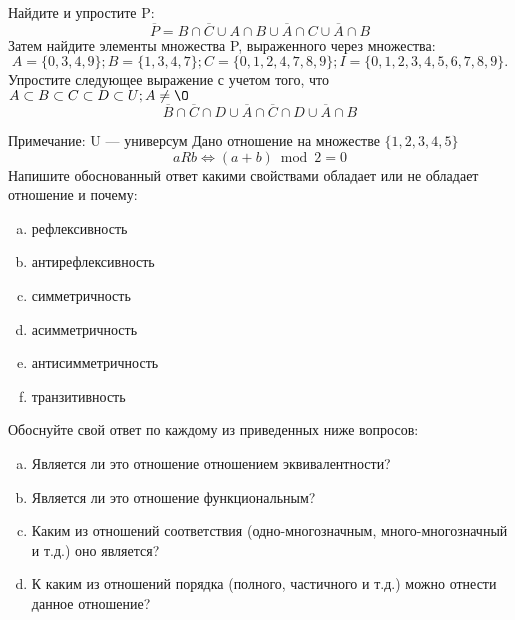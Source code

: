 \documentclass[10pt]{exam}
\begin{document}
\begin{questions}
\question
Найдите и упростите P:
\begin{equation*}
\overline{P} = B \cap \overline{C} \cup A \cap B \cup \overline{A} \cap C \cup \overline{A} \cap B
\end{equation*}
Затем найдите элементы множества P, выраженного через множества:
\begin{equation*}
A = \{0, 3, 4, 9\}; 
B = \{1, 3, 4, 7\};
C = \{0, 1, 2, 4, 7, 8, 9\};
I = \{0, 1, 2, 3, 4, 5, 6, 7, 8, 9\}.
\end{equation*}\question
Упростите следующее выражение с учетом того, что $A\subset B \subset C \subset D \subset U; A \neq \O$
\begin{equation*}
\overline{B} \cap \overline{C} \cap D \cup \overline{A} \cap \overline{C} \cap D \cup \overline{A} \cap B
\end{equation*}

Примечание: U — универсум\question
Дано отношение на множестве $\{1, 2, 3, 4, 5\}$ 
\begin{equation*}
aRb \iff (a+b) \bmod 2 =0
\end{equation*}
Напишите обоснованный ответ какими свойствами обладает или не обладает отношение и почему:   
\begin{enumerate} [a)]\setcounter{enumi}{0}
\item рефлексивность
\item антирефлексивность
\item симметричность
\item асимметричность
\item антисимметричность
\item транзитивность
\end{enumerate}

Обоснуйте свой ответ по каждому из приведенных ниже вопросов:
\begin{enumerate} [a)]\setcounter{enumi}{0}
    \item Является ли это отношение отношением эквивалентности?
    \item Является ли это отношение функциональным?
    \item Каким из отношений соответствия (одно-многозначным, много-многозначный и т.д.) оно является?
    \item К каким из отношений порядка (полного, частичного и т.д.) можно отнести данное отношение?
\end{enumerate}




\end{questions}
\end{document}
